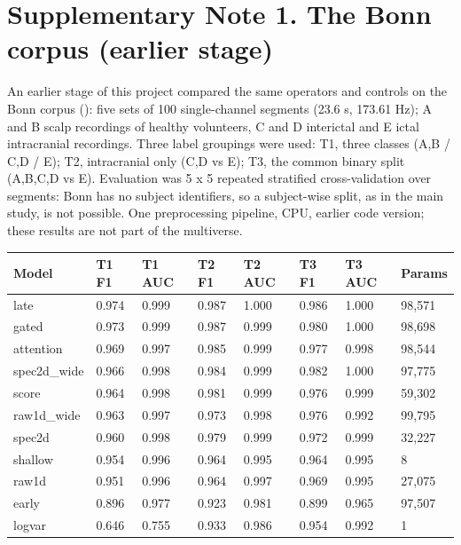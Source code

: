 \documentclass[11pt,a4paper]{article}
\newcounter{none} %
\begin{document}
\section{Supplementary Note 1. The Bonn corpus (earlier stage)}\label{supplementary-note-1.-the-bonn-corpus-earlier-stage}

An earlier stage of this project compared the same operators and controls on the Bonn
corpus (\citealp{Andrzejak_2001}): five sets of 100 single-channel segments (23.6 s,
173.61 Hz); A and B scalp recordings of healthy volunteers, C and D interictal and E
ictal intracranial recordings. Three label groupings were used: T1, three classes
(A,B / C,D / E); T2, intracranial only (C,D vs E); T3, the common binary split
(A,B,C,D vs E). Evaluation was 5 x 5 repeated stratified cross-validation over
segments: Bonn has no subject identifiers, so a subject-wise split, as in the main
study, is not possible. One preprocessing pipeline, CPU, earlier code version; these
results are not part of the multiverse.

{\def\LTcaptype{none} %
\begin{longtable}[]{@{}llllllll@{}}
\toprule\noalign{}
Model & T1 F1 & T1 AUC & T2 F1 & T2 AUC & T3 F1 & T3 AUC & Params \\
\midrule\noalign{}
\endhead
\bottomrule\noalign{}
\endlastfoot
late & 0.974 & 0.999 & 0.987 & 1.000 & 0.986 & 1.000 & 98,571 \\
gated & 0.973 & 0.999 & 0.987 & 0.999 & 0.980 & 1.000 & 98,698 \\
attention & 0.969 & 0.997 & 0.985 & 0.999 & 0.977 & 0.998 & 98,544 \\
spec2d\_wide & 0.966 & 0.998 & 0.984 & 0.999 & 0.982 & 1.000 & 97,775 \\
score & 0.964 & 0.998 & 0.981 & 0.999 & 0.976 & 0.999 & 59,302 \\
raw1d\_wide & 0.963 & 0.997 & 0.973 & 0.998 & 0.976 & 0.992 & 99,795 \\
spec2d & 0.960 & 0.998 & 0.979 & 0.999 & 0.972 & 0.999 & 32,227 \\
shallow & 0.954 & 0.996 & 0.964 & 0.995 & 0.964 & 0.995 & 8 \\
raw1d & 0.951 & 0.996 & 0.964 & 0.997 & 0.969 & 0.995 & 27,075 \\
early & 0.896 & 0.977 & 0.923 & 0.981 & 0.899 & 0.965 & 97,507 \\
logvar & 0.646 & 0.755 & 0.933 & 0.986 & 0.954 & 0.992 & 1 \\
\end{longtable}
}
\end{document}
